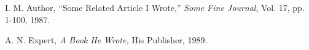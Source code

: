 \documentclass[10pt,twocolumn]{article}
\begin{document}

\begin{thebibliography}{9}
\small %


I. M. Author,
``Some Related Article I Wrote,''
{\em Some Fine Journal}, Vol. 17, pp. 1-100, 1987.

A. N. Expert,
{\em A Book He Wrote,}
His Publisher, 1989.

\end{thebibliography}
\end{document}
